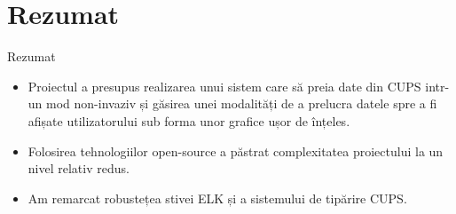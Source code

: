\documentclass{beamer}
\begin{document}
\section*{Rezumat}

\begin{frame}{Rezumat}
  \begin{itemize}[<+->]
  \item
    Proiectul a presupus realizarea unui sistem care să \alert{preia date din CUPS} intr-un mod \alert{non-invaziv} și găsirea unei modalități de a prelucra datele spre a fi afișate utilizatorului sub forma unor \alert{grafice ușor de înțeles}.
    \item
    Folosirea tehnologiilor \alert{open-source} a păstrat complexitatea proiectului la un nivel relativ redus.
    \item
    Am remarcat \alert{robustețea stivei ELK și a sistemului de tipărire CUPS}. 
  \end{itemize}
  
\end{frame}
\end{document}
